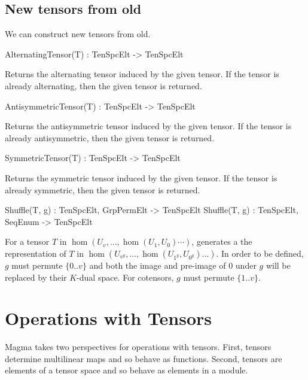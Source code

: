 \subsection{New tensors from old}
We can construct new tensors from old.

\begin{intrinsics}
AlternatingTensor(T) : TenSpcElt -> TenSpcElt
\end{intrinsics}

Returns the alternating tensor induced by the given tensor. If 
the tensor is already alternating, then the given tensor is returned.

\begin{intrinsics}
AntisymmetricTensor(T) : TenSpcElt -> TenSpcElt
\end{intrinsics}

Returns the antisymmetric tensor induced by the given tensor. If 
the tensor is already antisymmetric, then the given tensor is returned.

\begin{intrinsics}
SymmetricTensor(T) : TenSpcElt -> TenSpcElt
\end{intrinsics}

Returns the symmetric tensor induced by the given tensor. If the tensor is 
already symmetric, then the given tensor is returned.

\begin{intrinsics}
Shuffle(T, g) : TenSpcElt, GrpPermElt -> TenSpcElt
Shuffle(T, g) : TenSpcElt, SeqEnum -> TenSpcElt
\end{intrinsics}

For a tensor $T$ in $\hom(U_v,\dots,\hom(U_1,U_0)\cdots)$, 
generates a the representation of $T$ in $\hom(U_{v^g},\dots,\hom(U_{1^g},U_{0^g})\dots)$.
In order to be defined, $g$ must permute $\{0..v\}$ and both the image and 
pre-image of $0$ under $g$ will be replaced by their $K$-dual space.
For cotensors, $g$ must permute $\{1..v\}$.


\section{Operations with Tensors}

Magma takes two perspectives for operations with tensors. 
First, tensors determine multilinear maps and so behave as
functions.  Second, tensors are elements of a tensor space and 
so behave as elements in a module.  

